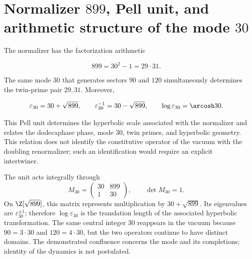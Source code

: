 \section{Normalizer \(899\), Pell unit, and arithmetic structure of the mode \(30\)}

The normalizer has the factorization arithmetic

\begin{equation}
899=30^2-1=29\cdot31.
\label{mab:rm:eq:899}
\end{equation}

The same mode \(30\) that generates sectors \(90\) and \(120\) simultaneously
determines the twin-prime pair \(29,31\). Moreover,

\begin{equation}
\varepsilon_{30}=30+\sqrt{899},\qquad
\varepsilon_{30}^{-1}=30-\sqrt{899},\qquad
\log\varepsilon_{30}=\arcosh30.
\label{mab:rm:eq:pell30}
\end{equation}

This Pell unit determines the hyperbolic scale associated with the
normalizer and relates the dodecaphase phase, mode \(30\), twin
primes, and hyperbolic geometry. This relation does not identify the
constitutive operator of the vacuum with the doubling renormalizer; such an
identification would require an explicit intertwiner.

The unit acts integrally through
\begin{equation}
M_{30}=\begin{pmatrix}30&899\\1&30\end{pmatrix},
\qquad \det M_{30}=1.
\label{mab:rm:eq:pell-matrix30}
\end{equation}
On \(\Z[\sqrt{899}]\), this matrix represents multiplication by
\(30+\sqrt{899}\). Its eigenvalues are \(\varepsilon_{30}^{\pm1}\); therefore
\(\log\varepsilon_{30}\) is the translation length of the associated hyperbolic
transformation. The same central integer \(30\) reappears in the vacuum
because \(90=3\cdot30\) and \(120=4\cdot30\), but the two operators continue to
have distinct domains. The demonstrated confluence concerns the mode and its
completions; identity of the dynamics is not postulated.


